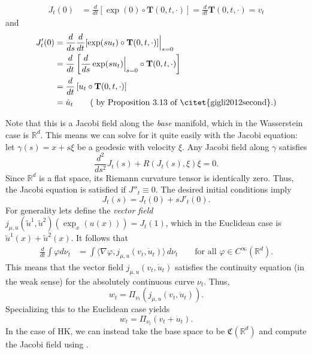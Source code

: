 \documentclass{article}
\begin{document}
\begin{align*}
    J_t(0) &= \frac{d}{dt}[\exp(0) \circ \mathbf{T}(0, t, \cdot)] = \frac{d}{dt}\mathbf{T}(0, t, \cdot) = v_t
\end{align*}
and
\begin{align*}
    J_t'(0) &= \frac{d}{ds} \frac{d}{dt} [\exp(su_t) \circ \mathbf{T}(0, t, \cdot)]\Big|_{s = 0} \\
    &=  \frac{d}{dt} \left[\frac{d}{ds}\exp(su_t)\Big|_{s = 0} \circ \mathbf{T}(0, t, \cdot)\right] \\
    &= \frac{d}{dt} \left[u_t \circ \mathbf{T}(0, t, \cdot)\right] \\
    &= \dot u_t  \tag{ by Proposition 3.13 of \citet{gigli2012second}.} 
\end{align*}

Note that this is a Jacobi field along the \textit{base} manifold, which in the Wasserstein case is $\mathbb{R}^d$. This means we can solve for it quite easily with the Jacobi equation: let $\gamma(s) = x + s\xi$ be a geodesic with velocity $\xi$. Any Jacobi field along $\gamma$ satisfies 
\[\frac{d^2}{ds^2}J_t(s) + R(J_t(s), \xi)\xi = 0.\]
Since $\mathbb{R}^d$ is a flat space, its Riemann curvature tensor is identically zero. Thus, the Jacobi equation is satisfied if $J''_t \equiv 0$. The desired initial conditions imply
\[J_t(s) = J_t(0) + sJ'_t(0).\]
For generality lets define the \textit{vector field} $j_{\mu, u}(\tilde{u}^1, \tilde{u}^2)(\exp_x(u(x))) = J_t(1)$, which in the Euclidean case is $\tilde{u}^1(x) + \tilde{u}^2(x)$. It follows that
\begin{align}
    \frac{d}{dt}\int \varphi d\nu_t &= \int \bigg\langle \nabla \varphi, j_{\mu, u}(v_t, \dot{u}_t)\bigg\rangle\, d\nu_t \qquad \text{for all } \varphi \in C^{\infty}(\mathbb{R}^d).
\end{align}
This means that the vector field $j_{\mu, u}(v_t, \dot{u}_t)$ satisfies the continuity equation (in the weak sense) for the absolutely continuous curve $\nu_t$. Thus,
\begin{equation}
    w_t = \Pi_{\nu_t}\left(j_{\mu, u}(v_t, \dot{u}_t)\right).
\end{equation}
Specializing this to the Euclidean case yields
\begin{equation}
    w_t = \Pi_{\nu_t}\left(v_t + \dot{u}_t\right).
\end{equation}
In the case of HK, we can instead take the base space to be $\mathfrak{C}(\mathbb{R}^d)$ and compute the Jacobi field using .
\end{document}
